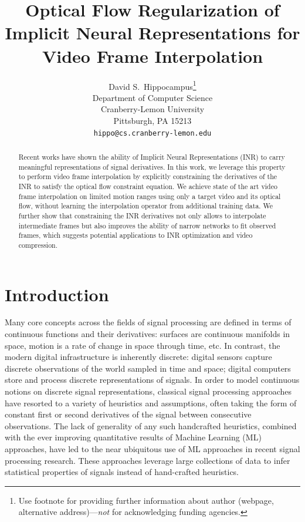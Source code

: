 \documentclass{article}
\title{Optical Flow Regularization of Implicit Neural Representations for Video Frame Interpolation}
\author{%
  David S.~Hippocampus\thanks{Use footnote for providing further information
    about author (webpage, alternative address)---\emph{not} for acknowledging
    funding agencies.} \\
  Department of Computer Science\\
  Cranberry-Lemon University\\
  Pittsburgh, PA 15213 \\
  \texttt{hippo@cs.cranberry-lemon.edu} \\
}
\begin{document}
\maketitle


\begin{abstract}
Recent works have shown the ability of Implicit Neural Representations (INR) to carry meaningful representations of signal derivatives.
In this work, we leverage this property to perform video frame interpolation
by explicitly constraining the derivatives of the INR to satisfy the optical flow constraint equation.
We achieve state of the art video frame interpolation on limited motion ranges
using only a target video and its optical flow, without learning the interpolation operator from additional training data.
We further show that constraining the INR derivatives not only
allows to interpolate intermediate frames but also improves the ability of narrow networks to fit observed frames,
which suggests potential applications to INR optimization and video compression.
\end{abstract}

\section{Introduction}


Many core concepts across the fields of signal processing are defined in terms of continuous functions and their derivatives:
surfaces are continuous manifolds in space,
motion is a rate of change in space through time, etc.
In contrast, the modern digital infrastructure is inherently discrete:
digital sensors capture discrete observations of the world sampled in time and space;
digital computers store and process discrete representations of signals.
In order to model continuous notions on discrete signal representations,
classical signal processing approaches have resorted to a variety of heuristics and assumptions,
often taking the form of constant first or second derivatives of the signal between consecutive observations.
The lack of generality of any such handcrafted heuristics,
combined with the ever improving quantitative results of Machine Learning (ML) approaches,
have led to the near ubiquitous use of ML approaches in recent signal processing research.
These approaches leverage large collections of data to infer statistical properties of signals instead of hand-crafted heuristics.
\end{document}
